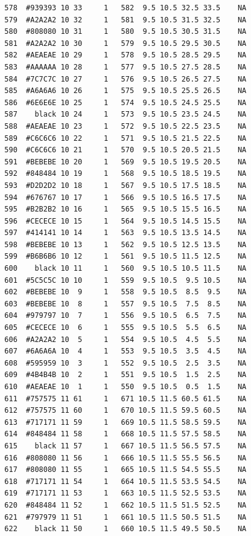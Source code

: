 \documentclass[12pt,twoside]{reedthesis}
\begin{document}
\begin{verbatim}
  578  #939393 10 33     1   582  9.5 10.5 32.5 33.5    NA
  579  #A2A2A2 10 32     1   581  9.5 10.5 31.5 32.5    NA
  580  #808080 10 31     1   580  9.5 10.5 30.5 31.5    NA
  581  #A2A2A2 10 30     1   579  9.5 10.5 29.5 30.5    NA
  582  #AEAEAE 10 29     1   578  9.5 10.5 28.5 29.5    NA
  583  #AAAAAA 10 28     1   577  9.5 10.5 27.5 28.5    NA
  584  #7C7C7C 10 27     1   576  9.5 10.5 26.5 27.5    NA
  585  #A6A6A6 10 26     1   575  9.5 10.5 25.5 26.5    NA
  586  #6E6E6E 10 25     1   574  9.5 10.5 24.5 25.5    NA
  587    black 10 24     1   573  9.5 10.5 23.5 24.5    NA
  588  #AEAEAE 10 23     1   572  9.5 10.5 22.5 23.5    NA
  589  #C6C6C6 10 22     1   571  9.5 10.5 21.5 22.5    NA
  590  #C6C6C6 10 21     1   570  9.5 10.5 20.5 21.5    NA
  591  #BEBEBE 10 20     1   569  9.5 10.5 19.5 20.5    NA
  592  #848484 10 19     1   568  9.5 10.5 18.5 19.5    NA
  593  #D2D2D2 10 18     1   567  9.5 10.5 17.5 18.5    NA
  594  #676767 10 17     1   566  9.5 10.5 16.5 17.5    NA
  595  #B2B2B2 10 16     1   565  9.5 10.5 15.5 16.5    NA
  596  #CECECE 10 15     1   564  9.5 10.5 14.5 15.5    NA
  597  #414141 10 14     1   563  9.5 10.5 13.5 14.5    NA
  598  #BEBEBE 10 13     1   562  9.5 10.5 12.5 13.5    NA
  599  #B6B6B6 10 12     1   561  9.5 10.5 11.5 12.5    NA
  600    black 10 11     1   560  9.5 10.5 10.5 11.5    NA
  601  #5C5C5C 10 10     1   559  9.5 10.5  9.5 10.5    NA
  602  #BEBEBE 10  9     1   558  9.5 10.5  8.5  9.5    NA
  603  #BEBEBE 10  8     1   557  9.5 10.5  7.5  8.5    NA
  604  #979797 10  7     1   556  9.5 10.5  6.5  7.5    NA
  605  #CECECE 10  6     1   555  9.5 10.5  5.5  6.5    NA
  606  #A2A2A2 10  5     1   554  9.5 10.5  4.5  5.5    NA
  607  #6A6A6A 10  4     1   553  9.5 10.5  3.5  4.5    NA
  608  #595959 10  3     1   552  9.5 10.5  2.5  3.5    NA
  609  #4B4B4B 10  2     1   551  9.5 10.5  1.5  2.5    NA
  610  #AEAEAE 10  1     1   550  9.5 10.5  0.5  1.5    NA
  611  #757575 11 61     1   671 10.5 11.5 60.5 61.5    NA
  612  #757575 11 60     1   670 10.5 11.5 59.5 60.5    NA
  613  #717171 11 59     1   669 10.5 11.5 58.5 59.5    NA
  614  #848484 11 58     1   668 10.5 11.5 57.5 58.5    NA
  615    black 11 57     1   667 10.5 11.5 56.5 57.5    NA
  616  #808080 11 56     1   666 10.5 11.5 55.5 56.5    NA
  617  #808080 11 55     1   665 10.5 11.5 54.5 55.5    NA
  618  #717171 11 54     1   664 10.5 11.5 53.5 54.5    NA
  619  #717171 11 53     1   663 10.5 11.5 52.5 53.5    NA
  620  #848484 11 52     1   662 10.5 11.5 51.5 52.5    NA
  621  #797979 11 51     1   661 10.5 11.5 50.5 51.5    NA
  622    black 11 50     1   660 10.5 11.5 49.5 50.5    NA

\end{verbatim}
\end{document}
